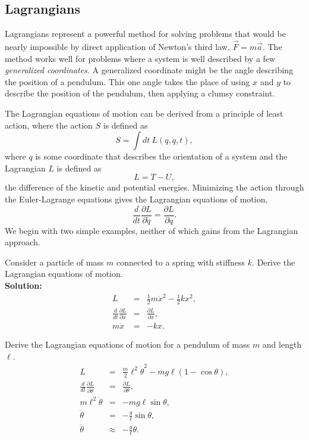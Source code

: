 \exampleend

\subsection{Lagrangians}

Lagrangians represent a powerful method for solving problems that
would be nearly impossible by direct application of Newton's third
law, $\vec{F}=m\vec{a}$. The method works well for problems where a
system is well described by a few \textit{generalized coordinates}. A
generalized coordinate might be the angle describing the position of a
pendulum. This one angle takes the place of using $x$ and $y$ to
describe the position of the pendulum, then applying a clumsy
constraint.

The Lagrangian equations of motion can be derived from a principle of
least action, where the action $S$ is defined as
\begin{equation}
S=\int dt~ L(q,\dot{q},t),
\end{equation}
where $q$ is some coordinate that describes the orientation of a
system and the Lagrangian $L$ is defined as
\begin{equation}
L=T-U,
\end{equation}
the difference of the kinetic and potential energies. Minimizing the
action through the Euler-Lagrange equations gives the Lagrangian
equations of motion,
\begin{equation}
\frac{d}{dt}\frac{\partial L}{\partial \dot{q}}=\frac{\partial
  L}{\partial q}.
\end{equation}
We begin with two simple examples, neither of which gains from the
Lagrangian approach.

\example Consider a particle of mass $m$ connected to a spring with
stiffness $k$. Derive the Lagrangian equations of motion.\\ {\bf
  Solution:}
\begin{eqnarray*}
L&=&\frac{1}{2}m\dot{x}^2-\frac{1}{2}kx^2,\\ \frac{d}{dt}\frac{\partial
  L}{\partial \dot{x}}&=&\frac{\partial L}{\partial
  x},\\ m\ddot{x}&=&-kx.
\end{eqnarray*}

\example Derive the Lagrangian equations of motion for a pendulum of
mass $m$ and length $\ell$.
\begin{eqnarray*}
L&=&\frac{m}{2}\ell^2\dot{\theta}^2-mg\ell(1-\cos\theta),\\ \frac{d}{dt}\frac{\partial
  L}{\partial \dot{\theta}}&=&\frac{\partial L}{\partial
  \theta},\\ m\ell^2\ddot{\theta}&=&-mg\ell\sin\theta,\\ \ddot{\theta}&=&-\frac{g}{\ell}\sin\theta,\\ \ddot{\theta}&\approx&-\frac{g}{\ell}\theta.
\end{eqnarray*}
\exampleend

